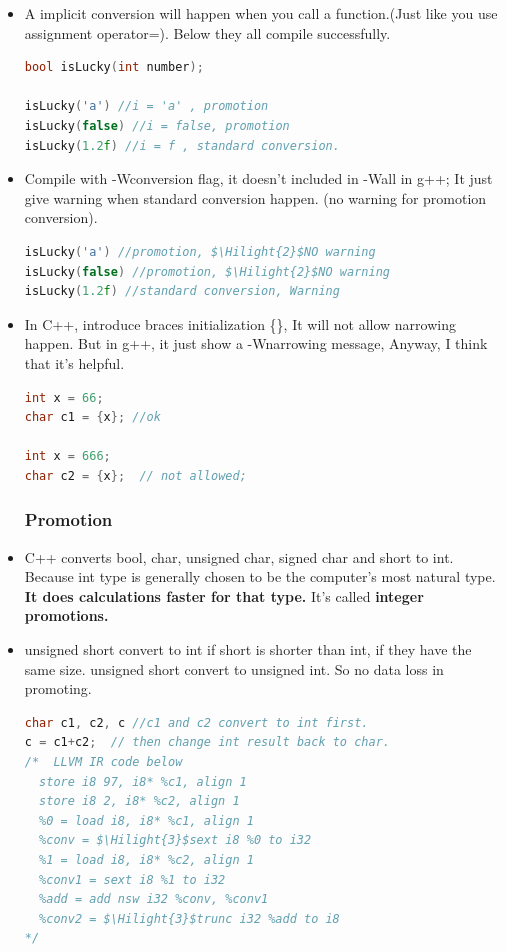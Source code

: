 \documentclass[a4paper,12pt,twoside]{book}
\newcommand{\Hilight}[1]{\makebox[0pt][l]{\color{yellow}\rule[-3pt]{#1em}{11pt}}}
\begin{document}
\begin{itemize}
\begin{lstlisting}[frame=single, language=c++]
int i, float f;
i=f;
//1) fragment will be lost,  f= 3.99, i will be 3 (not rounding)
//2) If f is too big.  undefined behave

f = i;
// 1) will lost precision if i is big.
\end{lstlisting}

\item A implicit conversion will happen when you call a function.(Just like you use assignment operator=). Below they all compile successfully. 
\begin{lstlisting}[frame=single, language=c++]
bool isLucky(int number);

isLucky('a') //i = 'a' , promotion
isLucky(false) //i = false, promotion
isLucky(1.2f) //i = f , standard conversion.
\end{lstlisting}

\item Compile with -Wconversion flag, it doesn't included in -Wall in g++; It just give warning when standard conversion happen. (no warning for promotion conversion).

\begin{lstlisting}[frame=single, language=c++, mathescape=true]
isLucky('a') //promotion, $\Hilight{2}$NO warning
isLucky(false) //promotion, $\Hilight{2}$NO warning
isLucky(1.2f) //standard conversion, Warning
\end{lstlisting}

\item In C++, introduce braces initialization \{\}, It will not allow narrowing happen. But in g++, it just show a -Wnarrowing message, Anyway, I think that it's helpful.
\begin{lstlisting}[frame=single, language=c++]
int x = 66;
char c1 = {x}; //ok

int x = 666;
char c2 = {x};  // not allowed;
\end{lstlisting}

\subsubsection{Promotion}
\item C++ converts bool, char, unsigned char, signed char and short to int. Because int type is generally chosen to be the computer's most natural type. \textbf{It does calculations faster for that type.} It's called \textbf{integer promotions.}

\item unsigned short convert to int if short is shorter than int, if they have the same size. unsigned short convert to unsigned int.  So no data loss in promoting.
\begin{lstlisting}[frame=single, language=c++, mathescape=true]
char c1, c2, c //c1 and c2 convert to int first.
c = c1+c2;  // then change int result back to char.
/*  LLVM IR code below
  store i8 97, i8* %c1, align 1
  store i8 2, i8* %c2, align 1
  %0 = load i8, i8* %c1, align 1
  %conv = $\Hilight{3}$sext i8 %0 to i32
  %1 = load i8, i8* %c2, align 1
  %conv1 = sext i8 %1 to i32
  %add = add nsw i32 %conv, %conv1
  %conv2 = $\Hilight{3}$trunc i32 %add to i8
*/


\end{lstlisting}
\end{itemize}
\end{document}
